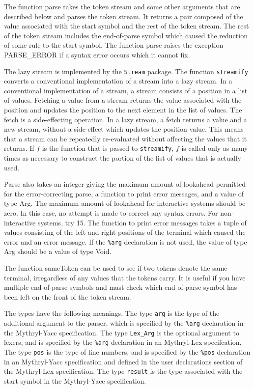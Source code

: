 The function parse takes the token stream and some other arguments that
are described below and parses the token stream.  It returns a pair composed
of the value associated with the start symbol and the rest of
the token stream.  The rest of the token stream includes the
end-of-parse symbol which caused the reduction of some rule
to the start symbol.  The function parse raises the
exception PARSE_ERROR if a syntax error occurs which it cannot fix.

The lazy stream is implemented by the {\tt Stream} package.
The function {\tt streamify} converts a conventional implementation
of a stream into a lazy stream.  In a conventional implementation
of a stream, a stream consists of a position in a list of
values.  Fetching a value from a stream returns the
value associated with the position and updates the position to
the next element in the list of values.  The fetch is a side-effecting
operation.  In a lazy stream, a fetch returns a value and a new
stream, without a side-effect which updates the position value.
This means that a stream can be repeatedly re-evaluated without
affecting the values that it returns.  If $f$ is the function
that is passed to {\tt streamify}, $f$ is called only as many
times as necessary to construct the portion of the list of values
that is actually used.

Parse also takes an integer giving the maximum amount of lookahead permitted
for the error-correcting parse, a function to print error messages,
and a value of type Arg.  The maximum amount of lookahead for interactive
systems should be zero.  In this case, no attempt is made to correct any
syntax errors.  For non-interactive systems, try 15.  The
function to print error messages takes a tuple of values consisting
of the left and right positions of the terminal which caused the error
and an error message.   If the {\tt \%arg} declaration is not used, the
value of type Arg should be a value of type Void.

The function sameToken can be used to see if two tokens
denote the same terminal, irregardless of any values that the
tokens carry.  It is useful if you have multiple end-of-parse
symbols and must check which end-of-parse symbol has been left on the
front of the token stream.

The types have the following meanings.  The type {\tt arg} is the type
of the additional argument to the parser, which is specified by the
{\tt \%arg} declaration in the Mythryl-Yacc specification.  The type
{\tt Lex_Arg} is the optional argument to lexers, and is specified by
the {\tt \%arg} declaration in an Mythryl-Lex specifcation.  The type {\tt pos}
is the type of line numbers, and is specified by the {\tt \%pos} declaration
in an Mythryl-Yacc specification and defined in the user declarations
section of the Mythryl-Lex specification.  The type {\tt result} is
the type associated with the start symbol in the Mythryl-Yacc specification.

